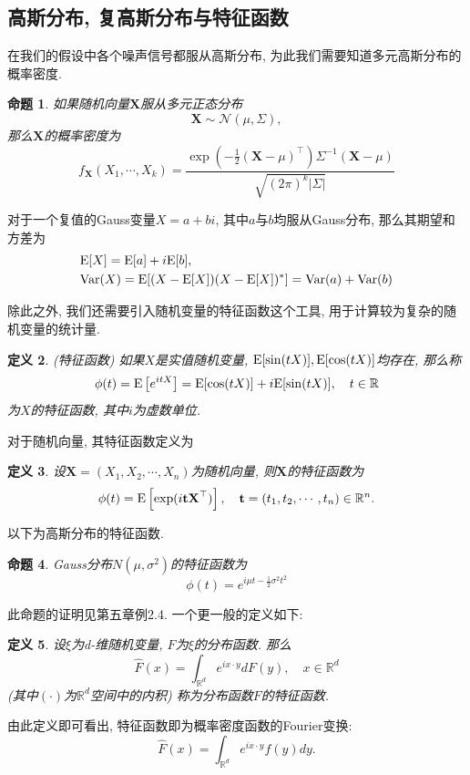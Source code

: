\documentclass[notitlepage,cs4size,punct,oneside]{ctexrep}
\numberwithin{equation}{section}
\theoremstyle{mystyle}
\newtheorem{definition}{\hspace{2em}定义}[section]
\newtheorem{proposition}[definition]{\hspace{2em}命题}
\begin{document}
\subsection{高斯分布, 复高斯分布与特征函数}
在我们的假设中各个噪声信号都服从高斯分布, 为此我们需要知道多元高斯分布的概率密度\cite{shuyuanhe2006probability}.
\begin{proposition} \label{multiVariable gaussian pdf}
如果随机向量$\textbf{X}$服从多元正态分布
$$\textbf{X} \sim \mathcal{N}(\mu, \Sigma),$$
那么$\textbf{X}$的概率密度为
$$f_\textbf{X}(X_1, \cdots, X_k) = \frac{\exp\left(-\frac{1}{2}(\textbf{X}-\mu)^\top\right)\Sigma^{-1}(\textbf{X}-\mu)}{\sqrt{(2\pi)^k|\Sigma|}}$$
\end{proposition}
对于一个复值的Gauss变量$X = a+bi$, 其中$a$与$b$均服从Gauss分布, 那么其期望和方差为
\begin{equation}
\begin{split}
&\text{E}[X] = \text{E}[a] + i\text{E}[b], \\
&\text{Var}(X) = \text{E}[(X-\text{E}[X])(X-\text{E}[X])^*] = \text{Var}(a) + \text{Var}(b)
\end{split}
\end{equation}

除此之外, 我们还需要引入随机变量的特征函数这个工具, 用于计算较为复杂的随机变量的统计量.
\begin{definition}(特征函数) 如果$X$是实值随机变量, $\text{E}[\sin(tX)], \text{E}[\cos(tX)]$均存在, 那么称
$$\phi(t) = \text{E}\left[e^{itX}\right] = \text{E}[\cos(tX)] + i\text{E}[\sin(tX)], \quad t\in \mathbb{R}$$
为$X$的特征函数, 其中$i$为虚数单位.
\end{definition}
对于随机向量, 其特征函数定义为
\begin{definition} 设$\textbf{X} = (X_1, X_2, \cdots, X_n)$为随机向量, 则$\textbf{X}$的特征函数为
$$\phi(t) = \text{E}\left[\exp(i\textbf{t}\textbf{X}^\top)\right], \quad \textbf{t} = (t_1, t_2, \cdots, t_n)\in \mathbb{R}^n.$$
\end{definition}
以下为高斯分布的特征函数.
\begin{proposition} \label{Characteristic function of Gaussian Distribution}
Gauss分布$N(\mu, \sigma^2)$的特征函数为
$$\phi(t) = e^{i\mu t - \frac{1}{2}\sigma^2t^2}$$
\end{proposition}
此命题的证明见\cite{shuyuanhe2006probability}第五章例2.4.
一个更一般的定义如下\cite{jiangangying2013probability}:
\begin{definition} \label{characteristic function definition 2} 设$\xi$为d-维随机变量, $F$为$\xi$的分布函数. 那么
$$\hat{F}(x) = \int_{\mathbb{R}^d} e^{ix\cdot y}dF(y), \quad x\in \mathbb{R}^d$$
(其中$(\cdot)$为$\mathbb{R}^d$空间中的内积) 称为分布函数$F$的特征函数.
\end{definition}
由此定义即可看出, 特征函数即为概率密度函数的Fourier变换:
\begin{equation} \label{characteristic function definition 3}
\hat{F}(x) = \int_{\mathbb{R}^d}e^{ix\cdot y}f(y)dy.
\end{equation}
\end{document}
